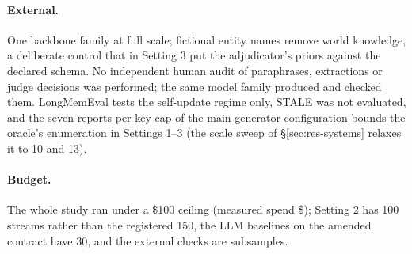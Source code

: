 \paragraph{External.} One backbone family at full scale; fictional entity names remove world knowledge, a deliberate control that in Setting 3 put the adjudicator's priors against the declared schema. No independent human audit of paraphrases, extractions or judge decisions was performed; the same model family produced and checked them. LongMemEval tests the self-update regime only, STALE was not evaluated, and the seven-reports-per-key cap of the main generator configuration bounds the oracle's enumeration in Settings 1--3 (the scale sweep of \S\ref{sec:res-systems} relaxes it to 10 and 13).

\paragraph{Budget.} The whole study ran under a \$100 ceiling (measured spend \$\spendTotal); Setting 2 has 100 streams rather than the registered 150, the LLM baselines on the amended contract have 30, and the external checks are subsamples.
